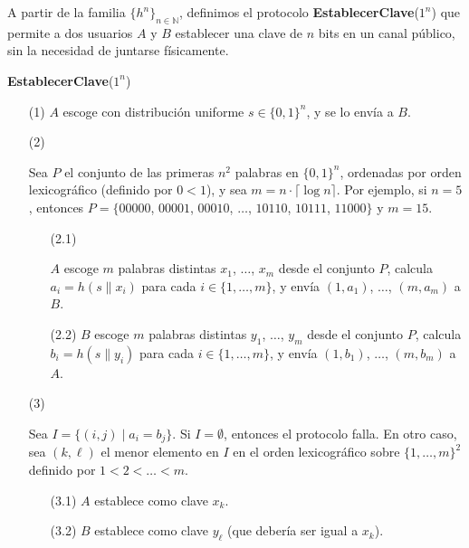A partir de la familia $\{h^n\}_{n \in \mathbb{N}}$, definimos el
protocolo {\bf EstablecerClave}($1^n$) que permite a dos usuarios $A$ y $B$
establecer una clave de $n$ bits en un canal público, sin la necesidad de juntarse físicamente.
\begin{flushleft}
{\bf EstablecerClave}($1^n$)
\begin{enumerate}
\item[(1)] $A$ escoge con distribución uniforme $s \in \{0,1\}^n$, y se lo envía a $B$.

\item[(2)] \begin{minipage}[t]{\linewidth}
Sea $P$ el conjunto de las primeras $n^2$ palabras en $\{0,1\}^n$, ordenadas por orden lexicográfico (definido por $0 < 1$), y sea $m = n \cdot \lceil \log n \rceil$. Por ejemplo, si $n = 5$, entonces $P=\{00000$, $00001$, $00010$, $\ldots$, $10110$, $10111$, $11000 \}$ y $m = 15$.
\end{minipage}
\begin{enumerate}
\item[(2.1)] \begin{minipage}[t]{\linewidth} $A$ escoge $m$ palabras distintas $x_1$, $\ldots$, $x_m$ desde el conjunto $P$, calcula $a_i = h(s \| x_i)$ para cada $i \in \{1, \ldots, m\}$, y envía $(1,a_1)$, $\ldots$, $(m,a_m)$ a $B$.
\end{minipage}

\item[(2.2)] $B$ escoge $m$ palabras distintas $y_1$, $\ldots$, $y_m$ desde el conjunto $P$, calcula $b_i = h(s \| y_i)$ para cada $i \in \{1, \ldots, m\}$, y envía $(1, b_1)$, $\ldots$, $(m, b_m)$ a $A$.
\end{enumerate}
\item[(3)] \begin{minipage}[t]{\linewidth}
Sea $I = \{ (i,j) \mid a_i = b_j\}$. Si $I = \emptyset$, entonces el protocolo falla. En otro caso, sea $(k, \ell)$ el menor elemento en $I$ en el orden lexicográfico sobre $\{1, \ldots, m\}^2$ definido por $1 < 2 < \dots < m$.
\end{minipage}
\begin{enumerate}
\item[(3.1)] $A$ establece como clave $x_{k}$.
\item[(3.2)] $B$ establece como clave $y_\ell$ (que debería ser igual a $x_k$).
\end{enumerate}
\end{enumerate}
\end{flushleft}
